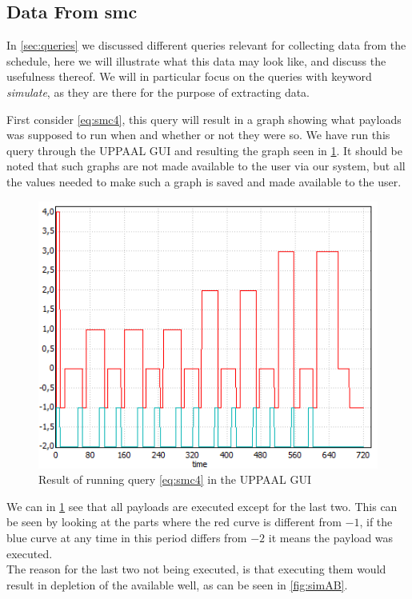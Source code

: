 \subsection{Data From \gls{smc}}
In \cref{sec:queries} we discussed different queries relevant for collecting data from the schedule, here we will illustrate what this data may look like, and discuss the usefulness thereof. We will in particular focus on the queries with keyword \textit{simulate}, as they are there for the purpose of extracting data.

First consider \cref{eq:smc4}, this query will result in a graph showing what payloads was supposed to run when and whether or not they were so. We have run this query through the UPPAAL GUI and resulting the graph seen in \cref{fig:active_running}. It should be noted that such graphs are not made available to the user via our system, but all the values needed to make such a graph is saved and made available to the user.

\begin{figure}[!h]
	\centering
	\includegraphics[scale=0.8]{graphics/active_running.png}
	\caption{Result of running query \ref{eq:smc4} in the UPPAAL GUI}
	\label{fig:active_running}
\end{figure}

We can in \cref{fig:active_running} see that all payloads are executed except for the last two. This can be seen by looking at the parts where the red curve is different from $-1$, if the blue curve at any time in this period differs from $-2$ it means the payload was executed. \\
The reason for the last two not being executed, is that executing them would result in depletion of the available well, as can be seen in \cref{fig:simAB}. 

